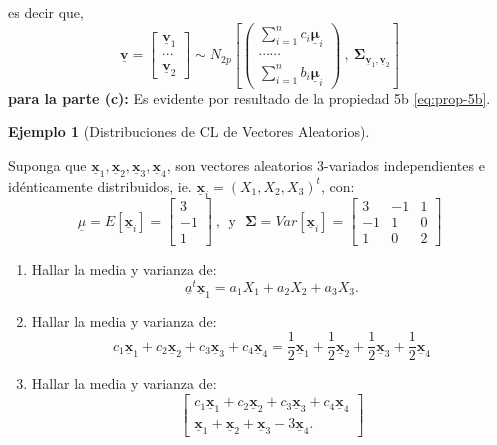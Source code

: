 \documentclass[
]{book}
\theoremstyle{definition}
\theoremstyle{definition}
\newtheorem{example}{Ejemplo}[chapter]
\theoremstyle{definition}
\theoremstyle{definition}
\theoremstyle{remark}
\begin{document}
es decir que,
\[
\underline{\mathbf{v}}=\begin{bmatrix}
\underline{\mathbf{v}}_1 \\ \cdots \\ \underline{\mathbf{v}}_2
\end{bmatrix} \sim N_{2p} \left[ \begin{pmatrix}
\sum_{i=1}^n c_i \underline{\mathbf{\mu}}_i \\ \cdots\cdots \\ \sum_{i=1}^n b_i \underline{\mathbf{\mu}}_i
\end{pmatrix} \ , \ \mathbf{\Sigma}_{\underline{\mathbf{v}}_1,\underline{\mathbf{v}}_2} \right]
\]
\textbf{para la parte (c):} Es evidente por resultado de la propiedad 5b \eqref{eq:prop-5b}.

\begin{example}[Distribuciones de CL de Vectores Aleatorios]
\protect\hypertarget{exm:ejemplo-dist-cl-vect-aleat}{}\label{exm:ejemplo-dist-cl-vect-aleat}

Suponga que \(\underline{\mathbf{x}}_1,\underline{\mathbf{x}}_2,\underline{\mathbf{x}}_3,\underline{\mathbf{x}}_4\), son vectores aleatorios \(3\)-variados independientes e idénticamente distribuidos, ie. \(\underline{\mathbf{x}}_i=(X_1,X_2,X_3)^t\), con:
\[
\underline{\mu}=E[\underline{\mathbf{x}}_i]=\begin{bmatrix}
3 \\ -1 \\ 1
\end{bmatrix}\ , \ \ \text{y} \ \ \ \mathbf{\Sigma}=Var[\underline{\mathbf{x}}_i]=\begin{bmatrix}
3 & -1 & 1 \\ -1 & 1 & 0 \\ 1 &0 &2
\end{bmatrix}
\]

\begin{enumerate}
\def\labelenumi{\arabic{enumi}.}
\item
  Hallar la media y varianza de:
  \[
  \underline{a}^t\underline{\mathbf{x}}_1=a_1X_1+a_2X_2+a_3X_3.
  \]
\item
  Hallar la media y varianza de:
  \[
  c_1\underline{\mathbf{x}}_1+c_2\underline{\mathbf{x}}_2+
  c_3\underline{\mathbf{x}}_3+
  c_4\underline{\mathbf{x}}_4=\frac{1}{2}\underline{\mathbf{x}}_1+
  \frac{1}{2}\underline{\mathbf{x}}_2+\frac{1}{2}\underline{\mathbf{x}}_3+\frac{1}{2}\underline{\mathbf{x}}_4
  \]
\item
  Hallar la media y varianza de:
  \[
  \begin{bmatrix}
  c_1\underline{\mathbf{x}}_1+c_2\underline{\mathbf{x}}_2+
  c_3\underline{\mathbf{x}}_3+
  c_4\underline{\mathbf{x}}_4\\  \underline{\mathbf{x}}_1+\underline{\mathbf{x}}_2+
  \underline{\mathbf{x}}_3-3\underline{\mathbf{x}}_4.
  \end{bmatrix}
  \]
\end{enumerate}

\end{example}
\end{document}
